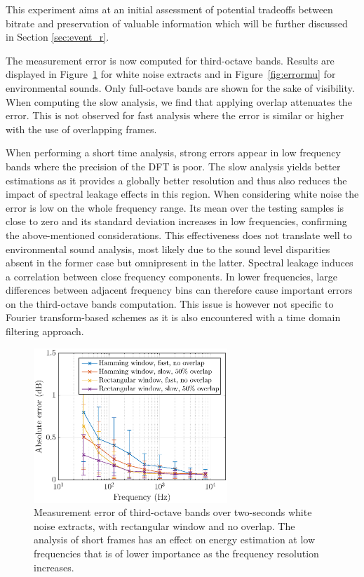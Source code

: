 \documentclass[sensors,article,accept,moreauthors,pdftex,10pt,a4paper]{mdpi}
\begin{document}
This experiment aims at an initial assessment of potential tradeoffs between bitrate and preservation of valuable information which will be further discussed in Section \ref{sec:event_r}.

The measurement error is now computed for third-octave bands. Results are displayed in Figure~\ref{fig:errormn} for white noise extracts and in Figure~\ref{fig:errormu} for environmental sounds. Only full-octave bands are shown for the sake of visibility. When computing the slow analysis, we find that applying overlap attenuates the error. This is not observed for fast analysis where the error is similar or higher with the use of overlapping frames.

When performing a short time analysis, strong errors appear in low frequency bands where the precision of the DFT is poor. The slow analysis yields better estimations as it provides a globally better resolution and thus also reduces the impact of spectral leakage effects in this region. When considering white noise the error is low on the whole frequency range. Its mean over the testing samples is close to zero and its standard deviation increases in low frequencies, confirming the above-mentioned considerations. This effectiveness does not translate well to environmental sound analysis, most likely due to the sound level disparities absent in the former case but omnipresent in the latter. Spectral leakage induces a correlation between close frequency components. In lower frequencies, large differences between adjacent frequency bins can therefore cause important errors on the third-octave bands computation. This issue is however not specific to Fourier transform-based schemes as it is also encountered with a time domain filtering approach.


\begin{figure}[H]
    \centering
    \includegraphics[width=0.65\textwidth]{figures/err_m_n.eps}
    \caption{Measurement error of third-octave bands over two-seconds white noise extracts, with rectangular window and no overlap. The analysis of short frames has an effect on energy estimation at low frequencies that is of lower importance as the frequency resolution increases.\label{fig:errormn}}
\end{figure}
\end{document}
